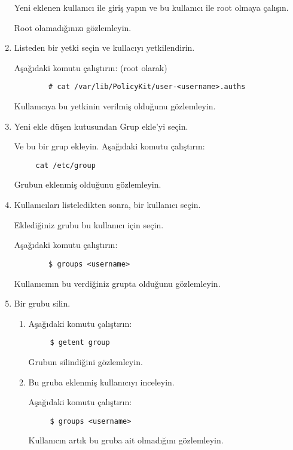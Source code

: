 \documentclass[a4paper,10pt]{article}
\begin{document}
\begin{enumerate}
        Yeni eklenen kullanıcı ile giriş yapın ve bu kullanıcı ile root olmaya çalışın. 
	
	Root olamadığınızı gözlemleyin.

    \item Listeden bir yetki seçin ve kullacıyı yetkilendirin.

        Aşağıdaki komutu çalıştırın: (root olarak)
    \begin{verbatim}
        # cat /var/lib/PolicyKit/user-<username>.auths
    \end{verbatim}
        Kullanıcıya bu yetkinin verilmiş olduğunu gözlemleyin.

    
\item Yeni ekle düşen kutusundan Grup ekle'yi seçin.

     Ve bu bir grup ekleyin.
     Aşağıdaki komutu çalıştırın:
\begin{verbatim}
     cat /etc/group
 \end{verbatim}
     Grubun eklenmiş olduğunu gözlemleyin.

\item Kullanıcıları listeledikten sonra, bir kullanıcı seçin. 

  Eklediğiniz grubu bu kullanıcı için seçin.

          Aşağıdaki komutu çalıştırın:
    \begin{verbatim}
        $ groups <username> 
    \end{verbatim}

        Kullanıcının bu verdiğiniz grupta olduğunu gözlemleyin.

\item Bir grubu silin.

\begin{enumerate}
    \item Aşağıdaki komutu çalıştırın:

\begin{verbatim}
     $ getent group
\end{verbatim} 

     Grubun silindiğini gözlemleyin.

    \item Bu gruba eklenmiş kullanıcıyı inceleyin.

     Aşağıdaki komutu çalıştırın:
\begin{verbatim}
     $ groups <username>
\end{verbatim}
     Kullanıcın artık bu gruba ait olmadığını gözlemleyin.
\end{enumerate}


\end{enumerate}
\end{document}
